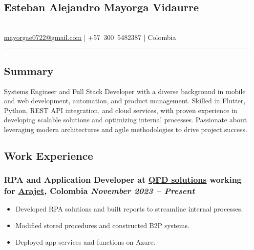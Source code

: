 \documentclass[a4paper,10pt]{article}
\begin{document}
\pagestyle{empty}

\begin{center}
  \section*{\LARGE Esteban Alejandro Mayorga Vidaurre} \\
  \href{mailto:mayorgae0722@gmail.com}{mayorgae0722@gmail.com} \quad | \quad +57~300~5482387 \quad | \quad Colombia
\end{center}

\hrule
\vspace{4pt}

\subsection*{Summary}
Systems Engineer and Full Stack Developer with a diverse background in mobile and web development, automation, and product management. Skilled in Flutter, Python, REST API integration, and cloud services, with proven experience in developing scalable solutions and optimizing internal processes. Passionate about leveraging modern architectures and agile methodologies to drive project success.

\subsection*{Work Experience}

\subsubsection*{%
  \textbf{RPA and Application Developer} at \href{https://www.linkedin.com/company/qfdsolutions}{QFD solutions} working for \href{https://www.linkedin.com/company/arajet/}{Arajet}, Colombia
  \hfill
  \textit{November 2023 -- Present}
}
\begin{itemize}
  \item Developed RPA solutions and built reports to streamline internal processes.
  \item Modified stored procedures and constructed B2P systems.
  \item Deployed app services and functions on Azure.
\end{itemize}
\end{document}
